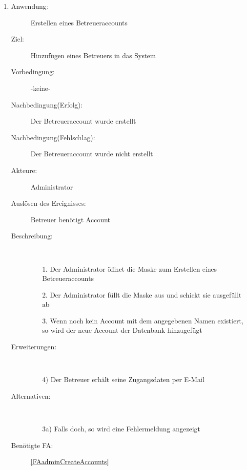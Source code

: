 \documentclass[parskip=full]{scrartcl}
\newcommand{\swtLabel}[1]{\textbf{/#1\arabic*0/}}
\begin{document}
\begin{enumerate} [label=\swtLabel{A}]
  \item \label{UCadminCreateBetreuer}
  \begin{description}
  \item[Anwendung:] Erstellen eines Betreueraccounts
  \item[Ziel:] Hinzufügen eines Betreuers in das System
  	\item[Vorbedingung:] -keine-
  	\item[Nachbedingung(Erfolg):] Der Betreueraccount wurde erstellt
  	\item[Nachbedingung(Fehlschlag):] Der Betreueraccount wurde nicht erstellt
  	\item[Akteure:] Administrator
  	\item[Auslösen des Ereignisses:] Betreuer benötigt Account
  	\item[Beschreibung:]~
  	 \begin{enumerate} 
  	   \item[1.] Der Administrator öffnet die Maske zum Erstellen eines
  	   Betreueraccounts  
  	   \item[2.] Der Administrator füllt die Maske aus und schickt sie ausgefüllt
  	   ab
  	   \item[3.] Wenn noch kein Account mit dem angegebenen Namen existiert, so
  	   wird der neue Account der Datenbank hinzugefügt
  	 \end{enumerate} 
  	\item[Erweiterungen:]~
  	 \begin{enumerate}
  	   \item[4)] Der Betreuer erhält seine Zugangsdaten per E-Mail
  	 \end{enumerate}  
  	\item[Alternativen:] ~
  	 \begin{enumerate}
  	  \item[3a)] Falls doch, so wird eine Fehlermeldung angezeigt
  	 \end{enumerate}  
  	 \item[Benötigte FA:] \ref{FAadminCreateAccounts}
  \end{description}
  

\end{enumerate}
\end{document}
